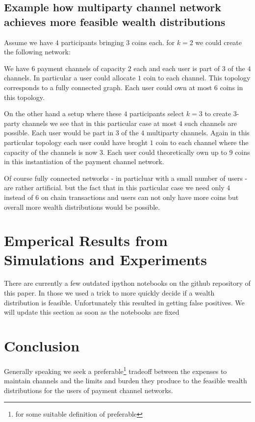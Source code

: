 \documentclass[10pt,twocolumn]{article}
\begin{document}
\subsection{Example how multiparty channel network achieves more feasible wealth distributions}
Assume we have $4$ participants bringing $3$ coins each. for $k=2$ we could create the following network:

We have $6$ payment channels of capacity $2$ each and each user is part of $3$ of the $4$ channels.
In particular a user could allocate $1$ coin to each channel.
This topology corresponds to a fully connected graph.
Each user could own at most $6$ coins in this topology.

On the other hand a setup where these $4$ participants select $k=3$ to create $3$-party channels we see that in this particular case at most $4$ such channels are possible.
Each user would be part in $3$ of the $4$ multiparty channels.
Again in this particular topology each user could have broght $1$ coin to each channel where the capacity of the channels is now $3$.
Each user could theoretically own up to $9$ coins in this instantiation of the payment channel network.

Of course fully connected networks - in particluar with a small number of users - are rather artificial. but the fact that in this particular case we need only $4$ instead of $6$ on chain transactions and users can not only have more coins but overall more wealth distributions would be possible.

\section{Emperical Results from Simulations and Experiments}
There are currently a few outdated ipython notebooks on the github repository of this paper.
In those we used a trick to more quickly decide if a wealth distribution is feasible.
Unfortunately this resulted in getting false positives.
We will update this section as soon as the notebooks are fixed

\section{Conclusion}
Generally speaking we seek a preferable\footnote{for some suitable definition of preferable} tradeoff between the expenses to maintain channels and the limits and burden they produce to the feasible wealth distributions for the users of payment channel networks.
\end{document}
